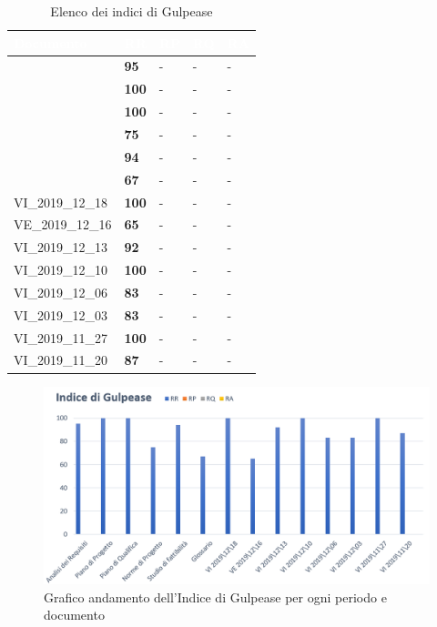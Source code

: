 {
\renewcommand{\arraystretch}{1.5}
\centering
\begin{longtable}{C{4cm} C{1cm} C{1cm} C{1cm} C{1cm}}
\caption{Elenco dei indici di Gulpease }\\
\textcolor{white}{\textbf{Documento}} & \textcolor{white}{\textbf{RR}} &
\textcolor{white}{\textbf{RP}} & \textcolor{white}{\textbf{RQ}} & 
\textcolor{white}{\textbf{RA}} \\
\hline
\endhead
{} & \textcolor{verde}{\textbf{95}} & - & - & -\\
 & \textcolor{verde}{\textbf{100}} & - & - & -\\
 & \textcolor{verde}{\textbf{100}} & - & - & - \\

 & \textcolor{giallo}{\textbf{75}} & - & - & -\\
 & \textcolor{verde}{\textbf{94}} & - & - & -\\

 & \textcolor{giallo}{\textbf{67}} & - & - & -\\

VI\_2019\_12\_18 & \textcolor{verde}{\textbf{100}} & - & - & -\\
VE\_2019\_12\_16 & \textcolor{giallo}{\textbf{65}} & - & - & -\\
VI\_2019\_12\_13 & \textcolor{verde}{\textbf{92}} & - & - & -\\
VI\_2019\_12\_10 & \textcolor{verde}{\textbf{100}} & - & - & -\\
VI\_2019\_12\_06 & \textcolor{verde}{\textbf{83}} & - & - & -\\
VI\_2019\_12\_03 & \textcolor{verde}{\textbf{83}} & - & - & -\\
VI\_2019\_11\_27 & \textcolor{verde}{\textbf{100}} & - & - & -\\
VI\_2019\_11\_20 & \textcolor{verde}{\textbf{87}} & - & - & -\\

\end{longtable}

\begin{figure}[h]
	\centering
	\includegraphics[scale=0.50]{Sezioni/Immagini/IG-Grafico.png}
	\caption{Grafico andamento dell'Indice di Gulpease per ogni periodo e documento}
\end{figure}
}